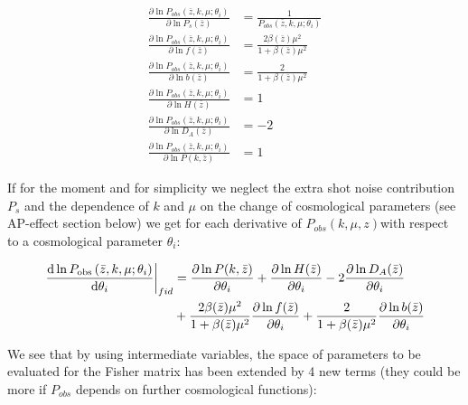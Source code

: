 \begin{subequations}
	
	\begin{align}
	\frac{\partial\ln P_{obs}\left(\bar{z},k,\mu;\theta_{i}\right)}{\partial\ln P_{s}(\bar{z})} & =\frac{1}{P_{obs}\left(\bar{z},k,\mu;\theta_{i}\right)}\\
	\frac{\partial\ln P_{obs}\left(\bar{z},k,\mu;\theta_{i}\right)}{\partial\ln f(\bar{z})} & =\frac{2\beta(\bar{z})\mu^{2}}{1+\beta(\bar{z})\mu^{2}}\\
	\frac{\partial\ln P_{obs}\left(\bar{z},k,\mu;\theta_{i}\right)}{\partial\ln b(\bar{z})} & =\frac{2}{1+\beta(\bar{z})\mu^{2}}\\
	\frac{\partial\ln P_{obs}\left(\bar{z},k,\mu;\theta_{i}\right)}{\partial\ln H(\bar{z})} & =1\\
	\frac{\partial\ln P_{obs}\left(\bar{z},k,\mu;\theta_{i}\right)}{\partial\ln D_{A}(\bar{z})} & =-2\\
	\frac{\partial\ln P_{obs}\left(\bar{z},k,\mu;\theta_{i}\right)}{\partial\ln P(k,\bar{z})} & =1
	\end{align}
	\label{eq: partial-derivs-subeqns}
	
\end{subequations}

If for the moment and for simplicity we neglect the extra shot noise
contribution $P_{s}$ and the dependence of $k$ and $\mu$ on the
change of cosmological parameters (see AP-effect section below) we
get for each derivative of $P_{obs}(k,\mu,z)$with respect to a cosmological
parameter $\theta_{i}$:

\begin{align}
\left.\frac{\mbox{d}\ln P_{{\rm obs}}\left(\bar{z},k,\mu;\theta_{i}\right)}{\mbox{d}\theta_{i}}\right|_{fid} & =\frac{\partial\ln P(k,\bar{z})}{\partial\theta_{i}}+\frac{\partial\ln H(\bar{z})}{\partial\theta_{i}}-2\frac{\partial\ln D_{A}(\bar{z})}{\partial\theta_{i}}\nonumber \\
& +\frac{2\beta(\bar{z})\mu^{2}}{1+\beta(\bar{z})\mu^{2}}\frac{\partial\ln f(\bar{z})}{\partial\theta_{i}}+\frac{2}{1+\beta(\bar{z})\mu^{2}}\frac{\partial\ln b(\bar{z})}{\partial\theta_{i}}\label{eq:derivatives-of-lnPobs-simplified-1}
\end{align}


We see that by using intermediate variables, the space of parameters
to be evaluated for the Fisher matrix has been extended by 4 new terms
(they could be more if $P_{obs}$ depends on further cosmological
functions): 

